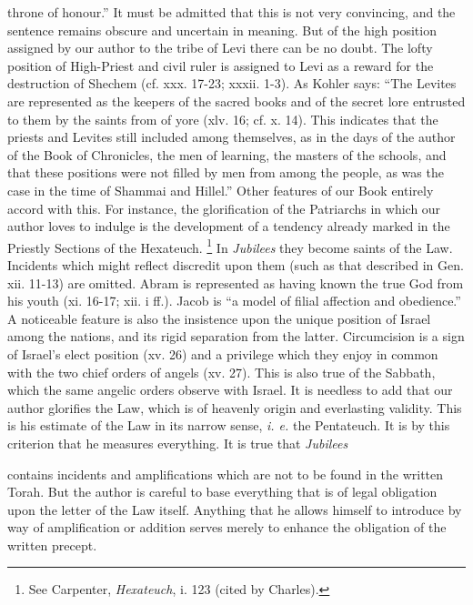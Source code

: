 throne of honour.'' It must be admitted that this is not very convincing, and the sentence remains obscure and uncertain in meaning. But of the high position assigned by our author to the tribe of Levi there can be no doubt. The lofty position of High-Priest and civil ruler is assigned to Levi as a reward for the destruction of Shechem (cf. xxx. 17-23; xxxii. 1-3). As Kohler says: ``The Levites are represented as the keepers of the sacred books and of the secret lore entrusted to them by the saints from of yore (xlv. 16; cf. x. 14). This indicates that the priests and Levites still included among themselves, as in the days of the author of the Book of Chronicles, the men of learning, the masters of the schools, and that these positions were not filled by men from among the people, as was the case in the time of Shammai and Hillel.'' Other features of our Book entirely accord with this. For instance, the glorification of the Patriarchs in which our author loves to indulge is the development of a tendency already marked in the Priestly Sections of the Hexateuch. \footnote{See Carpenter, \emph{Hexateuch}, i. 123 (cited by Charles).} In \emph{Jubilees} they become saints of the Law. Incidents which might reflect discredit upon them (such as that described in Gen. xii. 11-13) are omitted. Abram is represented as having known the true God from his youth (xi. 16-17; xii. i ff.). Jacob is ``a model of filial affection and obedience.'' A noticeable feature is also the insistence upon the unique position of Israel among the nations, and its rigid separation from the latter. Circumcision is a sign of Israel's elect position (xv. 26) and a privilege which they enjoy in common with the two chief orders of angels (xv. 27). This is also true of the Sabbath, which the same angelic orders observe with Israel. It is needless to add that our author glorifies the Law, which is of heavenly origin and everlasting validity. This is his estimate of the Law in its narrow sense, \emph{i. e.} the Pentateuch. It is by this criterion that he measures everything. It is true that \emph{Jubilees}

contains incidents and amplifications which are not to be found in the written Torah. But the author is careful to base everything that is of legal obligation upon the letter of the Law itself. Anything that he allows himself to introduce by way of amplification or addition serves merely to enhance the obligation of the written precept.

